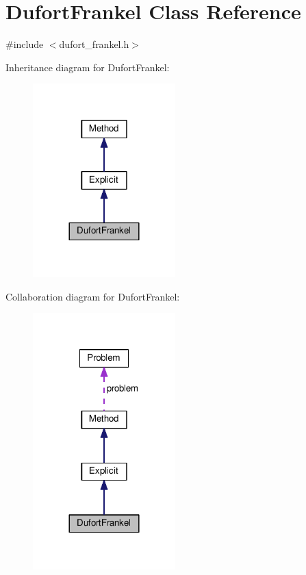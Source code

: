 \hypertarget{classDufortFrankel}{}\section{Dufort\+Frankel Class Reference}
\label{classDufortFrankel}


{\ttfamily \#include $<$dufort\+\_\+frankel.\+h$>$}



Inheritance diagram for Dufort\+Frankel\+:
\nopagebreak
\begin{figure}[H]
\begin{center}
\leavevmode
\includegraphics[width=156pt]{classDufortFrankel__inherit__graph}
\end{center}
\end{figure}


Collaboration diagram for Dufort\+Frankel\+:
\nopagebreak
\begin{figure}[H]
\begin{center}
\leavevmode
\includegraphics[width=156pt]{classDufortFrankel__coll__graph}
\end{center}
\end{figure}
